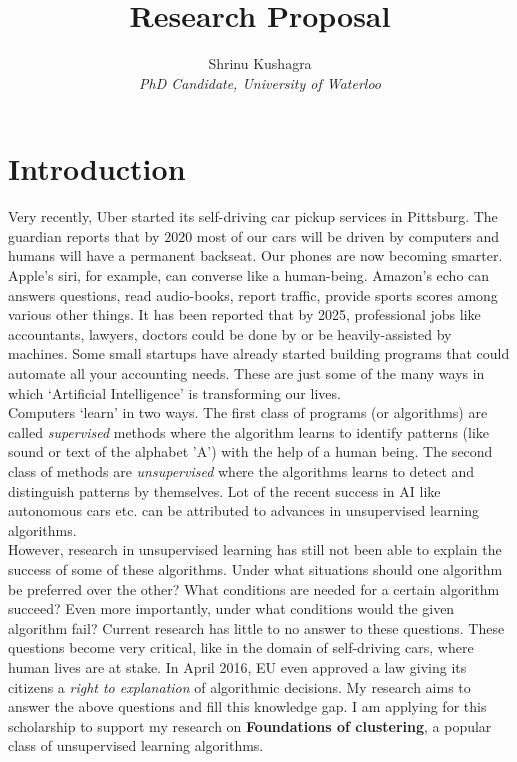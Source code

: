 \documentclass[11pt]{article}
\title{\textbf{Research Proposal}}
\author{Shrinu Kushagra\\
\textit{PhD Candidate, University of Waterloo}}
\date{}
\begin{document}
\maketitle

\section{Introduction}
Very recently, Uber started its self-driving car pickup services in Pittsburg. The guardian reports that by $2020$ most of our cars will be driven by computers and humans will have a permanent backseat. Our phones are now becoming smarter. Apple's siri, for example, can converse like a human-being. Amazon's echo can answers questions, read audio-books, report traffic, provide sports scores among various other things. It has been reported that by 2025, professional jobs like accountants, lawyers, doctors could be done by or be heavily-assisted by machines. Some small startups have already started building programs that could automate all your accounting needs. These are just some of the many ways in which `Artificial Intelligence' is transforming our lives.\\

Computers `learn' in two ways. The first class of programs (or algorithms) are called \textit{supervised} methods where the algorithm learns to identify patterns (like sound or text of the alphabet 'A') with the help of a human being.  The second class of methods are \textit{unsupervised} where the algorithms learns to detect and distinguish patterns by themselves. Lot of the recent success in AI like autonomous cars etc. can be attributed to advances in unsupervised learning algorithms. \\

However, research in unsupervised learning has still not been able to explain the success of some of these algorithms. Under what situations should one algorithm be preferred over the other? What conditions are needed for a certain algorithm succeed? Even more importantly, under what conditions would the given algorithm fail? Current research has little to no answer to these questions. These questions become very critical, like in the domain of self-driving cars, where human lives are at stake. In April 2016, EU even approved a law giving its citizens a \textit{right to explanation} of algorithmic decisions. My research aims to answer the above questions and fill this knowledge gap. I am applying for this scholarship  to support my research on \textbf{Foundations of clustering}, a popular class of unsupervised learning algorithms. 
\end{document}
